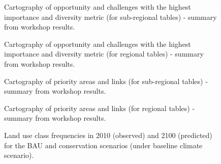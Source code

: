 {%

\begin{figure}[h!]
\caption{Cartography of opportunity and challenges  with the highest importance and diversity metric (for sub-regional tables) - summary from workshop results.}
\label{fig:reg_AC}
\end{figure}
\clearpage

\begin{figure}[h!]
\caption{Cartography of opportunity and challenges  with the highest importance and diversity metric (for regional tables) - summary from workshop results.}
\label{fig:trans_AC}
\end{figure}
\clearpage


\begin{figure}[h!]
\caption{Cartography of priority areas and links (for sub-regional tables) - summary from workshop results.}
\label{fig:reg}
\end{figure}
\clearpage

\begin{figure}[h!]
\caption{Cartography of priority areas and links (for regional tables) - summary from workshop results.}
\label{fig:trans}
\end{figure}
\clearpage


\begin{figure}[h!]
\caption{Land use class frequencies in 2010 (observed) and 2100 (predicted) for the BAU and conservation scenarios (under baseline climate scenario).}
\label{fig:bar_chap2}
\end{figure}


}
